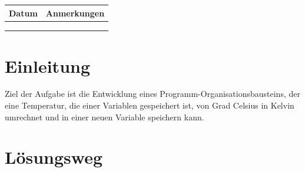 \documentclass[10pt,a4paper]{article}
\newlength{\myoddoffset}
\begin{document}
\begin{titlepage}
		
	\newcommand{\abstand}{120pt}	
	\begin{table}[htp]
		\begin{tabular}{|p{2cm}|p{12.5cm }|}
			\hline
			\textbf{Datum} & \textbf{Anmerkungen} \\ \hline
			               &                      \\[\abstand] \hline
			               &                      \\[\abstand] \hline
			               &                      \\[\abstand] \hline
		\end{tabular}
	\end{table}
	
		
	\vfill
		
\end{titlepage}


\fancyhf{}
\fancyhead[LE,RO]{\leftmark}
\fancyhead[RE,LO]{\studiengruppe}
\fancyfoot[RE,LO]{\modul}
\fancyfoot[LE,RO]{\thepage /\pageref{LastPage}}


\tableofcontents
\listoffigures
\lstlistoflistings
\clearpage

\section{Einleitung}
Ziel der Aufgabe ist die Entwicklung eines Programm-Organisationsbausteins,  der eine Temperatur,  die einer Variablen gespeichert ist, von Grad Celsius in Kelvin umrechnet und in einer neuen Variable speichern kann.
\pagebreak

\section{Lösungsweg}
\end{document}

